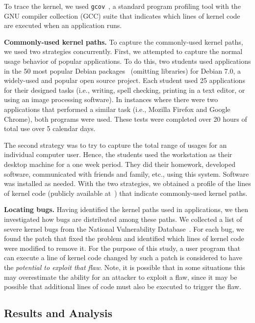 To trace the kernel, we used \texttt{gcov}~\cite{gcov}, a standard program profiling tool with
the GNU compiler collection (GCC) suite that indicates which lines of kernel
code are executed when an application runs. 

\textbf{Commonly-used kernel paths.}
To capture the commonly-used kernel paths, we used two strategies concurrently.
First, we attempted to capture the normal usage behavior of popular applications.
To do this, two students used applications in the 50 most popular Debian
packages~\cite{Top-Packages} (omitting libraries) for Debian 7.0, a widely-used and 
popular open source project. 
Each student used 25 applications for their designed
tasks (i.e., writing, spell checking, printing in a text editor, or using 
an image processing software). In instances where there were two applications that performed a
similar task (i.e., Mozilla Firefox and Google Chrome), both programs were
used. These tests were completed over 20 hours of
total use over 5 calendar days. 

The second strategy was to try to capture the total range of usages for an
individual computer user. Hence, the students used the workstation as their
desktop machine for a one week period. They did their homework, developed
software, communicated with friends and family, etc., using this system.
Software was installed as needed.
%
With the two strategies, we obtained a profile of the lines of
kernel code (publicly available at~\cite{Lind}) that indicate
commonly-used kernel paths.

\textbf{Locating bugs.}
Having identified the kernel paths used in applications, 
we then investigated how bugs are distributed among these paths. We collected a list of
severe kernel bugs from the National Vulnerability Database~\cite{NVD}. 
For each bug, we found the patch that fixed the problem and identified
which lines of kernel code were modified to remove it.
For the purpose of this study, a user program that can execute a line of kernel
code changed by such a patch is considered to have the \textit{potential to
exploit that flaw}.  Note, it is possible that in some situations this may
overestimate the ability for an attacker to exploit a flaw, since it may be
possible that additional lines of code must also be executed to trigger the flaw.


\subsection{Results and Analysis}
\label{Verification-of-Hypothesis}

